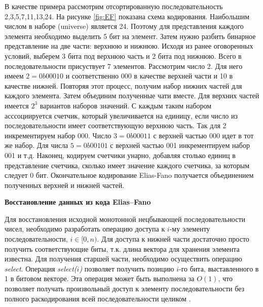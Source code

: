 В качестве примера рассмотрим отсортированную последовательность {2,3,5,7,11,13,24}.
На рисунке \ref{fig:EF} показана схема кодирования. Наибольшим числом в наборе (universe) является 24.
Поэтому для представления каждого элемента необходимо выделить 5 бит на элемент.
Затем нужно разбить бинарное представление на две части: верхнюю и нижнюю.
Исходя из ранее оговоренных условий, выберем 3 бита под верхнюю часть и 2 бита под нижнюю.
Всего в последовательности присуствует 7 элементов. Рассмотрим число 2. Для него имеем
$2 = 0b00010$ и соответственно 000 в качестве верхней части и 10 в качестве нижней.
Повторяя этот процесс, получим набор нижних частей для каждого элемента.
Затем объединим полученные чати вместе. Для верхних частей имеется $2^3$ вариантов
наборов значений. С каждым таким набором асссоциируется счетчик, который увеличивается на единицу,
если число из последовательности имеет соответствующую верхнюю часть.
Так для 2 инкрементируем набор 000. Число $3 = 0b00011$ с верхней частью 000 идет в тот же набор.
Для числа $5 = 0b00101$ с верхней частью 001 инкрементируем набор 001 и т.д.
Наконец, кодируем счетчики унарно, добавляя столько единиц в представление счетчика,
сколько имеет значение каждого счетчика, за которым следует 0 бит.
Окончательное кодирование Elias-Fano получается объединением полученных верхней и нижней частей.

\textbf{Восстановление данных из кода Elias--Fano}

Для восстановления исходной монотонной нецбывающей последовательности чисел, необходимо разработать операцию
доступа к $i$-му элементу последовательности, $i \in [0, n)$. Для доступа к нижней части
достаточно просто получить соответствующие биты, т.к. длина вектора для хранения элемента известна.
Для получения старшей части, необходимо осуществить операцию \emph{select}.
Операция \emph{select($i$)} позволяет получить позицию $i$-го бита, выставленного в 1 в битовом векторе.
Эта операция может быть выполнена за $O(1)$, что позволяет получать произвольный доступ к элементу
последовательности без полного раскодирования всей последовательности целиком \cite{farina2009rank}.